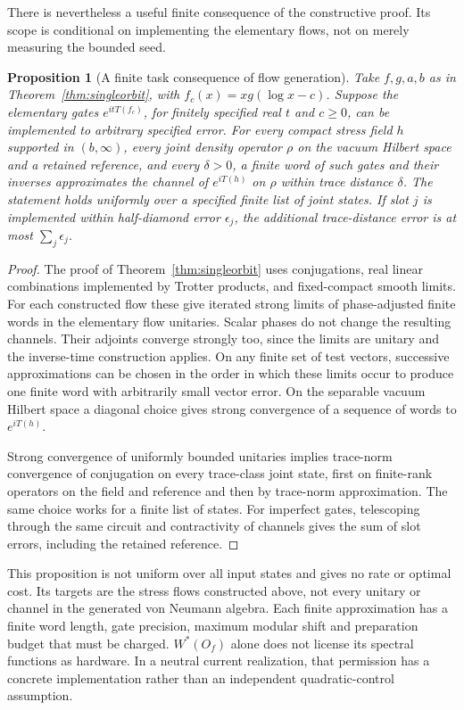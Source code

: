\documentclass[12pt]{article}
\newtheorem{proposition}[theorem]{Proposition}
\theoremstyle{definition}
\theoremstyle{remark}
\begin{document}
There is nevertheless a useful finite consequence of the constructive proof.
Its scope is conditional on implementing the elementary flows, not on merely
measuring the bounded seed.

\begin{proposition}[A finite task consequence of flow generation]\label{prop:finitewords}
Take \(f,g,a,b\) as in Theorem~\ref{thm:singleorbit}, with
\(f_c(x)=xg(\log x-c)\).
Suppose the elementary gates \(e^{itT(f_c)}\), for finitely specified real
\(t\) and \(c\ge0\), can be implemented to arbitrary specified error.
For every compact stress field \(h\) supported in \((b,\infty)\), every
joint density operator \(\rho\) on the vacuum Hilbert space and a retained reference, and
every \(\delta>0\), a finite word of such gates and their inverses approximates
the channel of \(e^{iT(h)}\) on \(\rho\) within trace distance \(\delta\).
The statement holds uniformly over a specified finite list of joint states.
If slot \(j\) is implemented within half-diamond error \(\epsilon_j\), the
additional trace-distance error is at most \(\sum_j\epsilon_j\).
\end{proposition}
\begin{proof}
The proof of Theorem~\ref{thm:singleorbit} uses conjugations, real linear
combinations implemented by Trotter products, and fixed-compact smooth limits.
For each constructed flow these give iterated strong limits of phase-adjusted
finite words in the elementary flow unitaries. Scalar phases do not change
the resulting channels. Their adjoints converge strongly too, since the
limits are unitary and the inverse-time construction applies.
On any finite set of test vectors, successive approximations can be chosen
in the order in which these limits occur to produce one finite word with
arbitrarily small vector error. On the separable vacuum Hilbert space a
diagonal choice gives strong convergence of a sequence of words to
\(e^{iT(h)}\).

Strong convergence of uniformly bounded unitaries implies trace-norm
convergence of conjugation on every trace-class joint state, first on
finite-rank operators on the field and reference and then by trace-norm
approximation. The same choice works for a finite list of states.
For imperfect gates, telescoping through the same circuit and contractivity
of channels gives the sum of slot errors, including the retained reference.
\end{proof}

This proposition is not uniform over all input states and gives no rate or
optimal cost. Its targets are the stress flows constructed above, not every
unitary or channel in the generated von Neumann algebra. Each finite
approximation has a finite word length, gate
precision, maximum modular shift and preparation budget that must be charged.
\(W^*(O_f)\) alone does not license its spectral functions as hardware.
In a neutral current realization, that permission has a concrete
implementation rather than an independent quadratic-control assumption.
\end{document}

